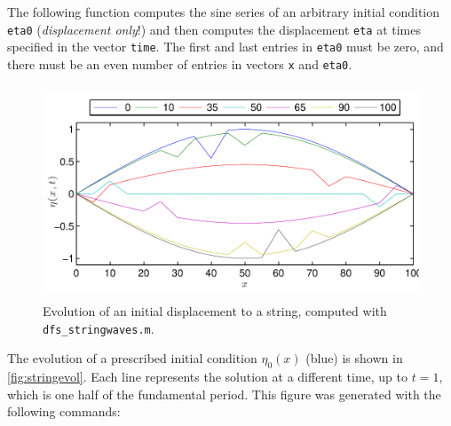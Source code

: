 \documentclass[11pt,twoside,a4paper]{article}
\begin{document}
The following \Mlab function computes the sine series of an arbitrary
initial condition \texttt{eta0} (\textit{displacement only}!) and then
computes the displacement \texttt{eta} at times specified in the
vector \texttt{time}.  The first and last entries in \texttt{eta0}
must be zero, and there must be an even number of entries in vectors
\texttt{x} and \texttt{eta0}.



\begin{figure}[tb]
  \centering
  \includegraphics[height=2.5in]{../figs/L20/StringEvolution}
  \caption{Evolution of an initial displacement to a string, computed
    with \texttt{dfs\_stringwaves.m}.}
  \label{fig:stringevol}
\end{figure}

The evolution of a prescribed initial condition $\eta_0(x)$ (blue) is
shown in \autoref{fig:stringevol}.  Each line represents the solution
at a different time, up to $t=1$, which is one half of the fundamental
period.  This figure was generated with the following \Mlab commands:
   
 
\end{document}

